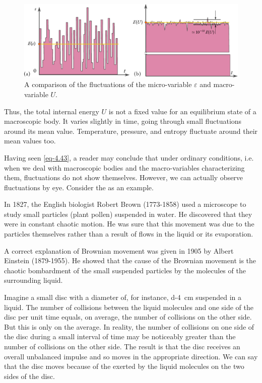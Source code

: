 \begin{figure}%
\includegraphics[width=1.2\tfwidth]{figures/macro-micro.pdf}
\caption{A comparison of the fluctuations of the micro-variable	$\varepsilon$ and	macro-variable $U$.\label{macro-micro}}
\end{figure}

Thus, the total internal energy $U$ is not a fixed value for an equilibrium state of a macroscopic body. It varies slightly in time, going through small fluctuations around its mean value. Temperature, pressure, and entropy fluctuate around their mean values too.


 Having seen \eqref{eq-4.43}, a reader may conclude that under ordinary conditions, i.e. when we deal with macroscopic bodies and the macro-variables characterizing them, fluctuations do not show themselves. However, we can actually observe fluctuations by eye. Consider the  as an example.

In 1827, the English biologist Robert Brown (1773-1858) used a microscope to study small particles (plant pollen) suspended in water. He discovered that they were in constant chaotic motion. He was sure that this movement was due to the particles themselves rather than a result of flows in the liquid or its evaporation.

A correct explanation of Brownian movement was given in 1905 by Albert Einstein (1879-1955). He showed that the cause of the Brownian movement is the chaotic bombardment of the small suspended particles by the molecules of the surrounding liquid.

Imagine a small disc with a diameter of, for instance, \SI{d-4}{\centi\meter} suspended in a liquid. The number of collisions between the liquid molecules and one side of the disc per unit time equals, on average, the number of collisions on the other side. But this is only on the average. In reality, the number of collisions on one side of the disc during a small interval of time may be noticeably greater than the number of collisions on the other side. The result is that the disc receives an overall unbalanced impulse and so moves in the appropriate direction. We can say that the disc moves because of the  exerted by the liquid molecules on the two sides of the disc.

